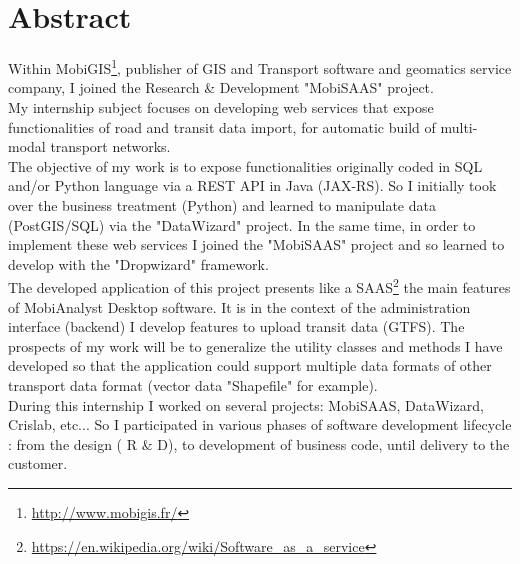 \documentclass[12pt,openany]{StyleBertrand}
\author{Bertrand Guerrero}
\begin{document}
\chapter*{Abstract}

Within MobiGIS\footnote{\url{http://www.mobigis.fr/}}, publisher of GIS and Transport software and geomatics service company, I joined the Research \& Development "MobiSAAS" project. \\

My internship subject focuses on developing web services that expose functionalities of road and transit data import, for automatic build of multi-modal transport networks. \\

The objective of my work is to expose functionalities originally coded in SQL and/or Python language via a REST API in Java (JAX-RS). So I initially took over the business treatment (Python) and learned to manipulate data (PostGIS/SQL) via the "DataWizard" project. In the same time, in order to implement these web services I joined the "MobiSAAS" project and so learned to develop with the "Dropwizard" framework. \\

The developed application of this project presents like a SAAS\footnote{\url{https://en.wikipedia.org/wiki/Software_as_a_service}} the main features of MobiAnalyst Desktop software. It is in the context of the administration interface (backend) I develop features to upload transit data (GTFS). The prospects of my work will be to generalize the utility classes and methods I have developed so that the application could support multiple data formats of other transport data format (vector data "Shapefile" for example). \\

During this internship I worked on several projects: MobiSAAS, DataWizard, Crislab, etc... So I participated in various phases of software development lifecycle : from the design ( R \& D), to development of business code, until delivery to the customer. \\
\end{document}
